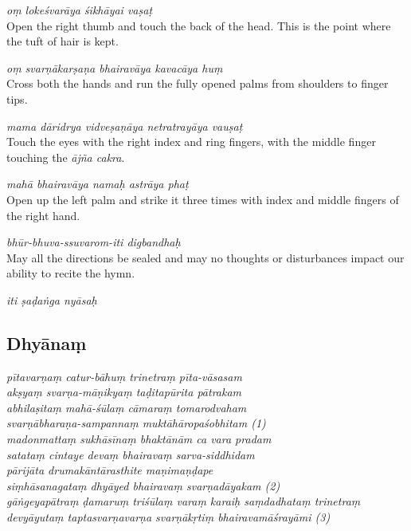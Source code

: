 \documentclass[11pt,oneside,a4paper]{article}
\newenvironment{shloka}[1]
  {\bigskip\center#1\varwidth{\linewidth}}
  {\endvarwidth\endcenter\bigskip}
\newcommand{\tl}[1]{\emph{#1}}
\begin{document}
\tl{oṃ lokeśvarāya śikhāyai vaṣaṭ}\\
Open the right thumb and touch the back of the head. This is the point where
the tuft of hair is kept.

\tl{oṃ svarṇākarṣaṇa bhairavāya kavacāya huṃ}\\
Cross both the hands and run the fully opened palms from shoulders to finger
tips.

\tl{mama dāridrya vidveṣaṇāya netratrayāya vauṣaṭ}\\
Touch the eyes with the right index and ring fingers, with the middle finger
touching the \tl{ājña cakra}.

\tl{mahā bhairavāya namaḥ astrāya phaṭ}\\
Open up the left palm and strike it three times with index and middle fingers
of the right hand.

\tl{bhūr-bhuva-ssuvarom-iti digbandhaḥ}\\
May all the directions be sealed and may no thoughts or disturbances impact our
ability to recite the hymn.

\begin{shloka}\itshape
  iti ṣaḍaṅga nyāsaḥ
\end{shloka}

\subsection{Dhyānaṃ}

\begin{shloka}\itshape
  pītavarṇaṃ catur-bāhuṃ trinetraṃ pīta-vāsasam\\
  akṣyaṃ svarṇa-māṇikyaṃ taḍitapūrita pātrakam\\
  abhilaṣitaṃ mahā-śūlaṃ cāmaraṃ tomarodvaham\\
  svarṇābharaṇa-sampannaṃ muktāhāropaśobhitam (1)\\

  madonmattaṃ sukhāsīnaṃ bhaktānām ca vara pradam\\
  satataṃ cintaye devaṃ bhairavaṃ sarva-siddhidam\\
  pārijāta drumakāntārasthite maṇimaṇḍape\\
  siṃhāsanagataṃ dhyāyed bhairavaṃ svarṇadāyakam (2)\\

  gāṅgeyapātraṃ ḍamaruṃ triśūlaṃ varaṃ karaiḥ saṃdadhataṃ trinetraṃ\\
  devyāyutaṃ taptasvarṇavarṇa svarṇākṛtiṃ bhairavamāśrayāmi (3)\\
\end{shloka}
\end{document}
